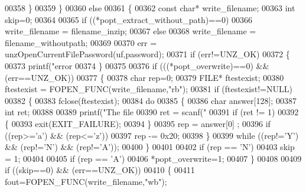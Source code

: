 \begin{DoxyCode}
{{{{{{{{{{00358         \}
00359     \}
00360     \textcolor{keywordflow}{else}
00361     \{
00362         \textcolor{keyword}{const} \textcolor{keywordtype}{char}* write\_filename;
00363         \textcolor{keywordtype}{int} skip=0;
00364 
00365         \textcolor{keywordflow}{if} ((*popt\_extract\_without\_path)==0)
00366             write\_filename = filename\_inzip;
00367         \textcolor{keywordflow}{else}
00368             write\_filename = filename\_withoutpath;
00369 
00370         err = unzOpenCurrentFilePassword(uf,password);
00371         \textcolor{keywordflow}{if} (err!=UNZ\_OK)
00372         \{
00373             printf(\textcolor{stringliteral}{"error %
00374         \}
00375 
00376         \textcolor{keywordflow}{if} (((*popt\_overwrite)==0) && (err==UNZ\_OK))
00377         \{
00378             \textcolor{keywordtype}{char} rep=0;
00379             FILE* ftestexist;
00380             ftestexist = FOPEN\_FUNC(write\_filename,\textcolor{stringliteral}{"rb"});
00381             \textcolor{keywordflow}{if} (ftestexist!=NULL)
00382             \{
00383                 fclose(ftestexist);
00384                 \textcolor{keywordflow}{do}
00385                 \{
00386                     \textcolor{keywordtype}{char} answer[128];
00387                     \textcolor{keywordtype}{int} ret;
00388 
00389                     printf(\textcolor{stringliteral}{"The file %
00390                     ret = scanf(\textcolor{stringliteral}{"%
00391                     \textcolor{keywordflow}{if} (ret != 1)
00392                     \{
00393                        exit(EXIT\_FAILURE);
00394                     \}
00395                     rep = answer[0] ;
00396                     \textcolor{keywordflow}{if} ((rep>=\textcolor{charliteral}{'a'}) && (rep<=\textcolor{charliteral}{'z'}))
00397                         rep -= 0x20;
00398                 \}
00399                 \textcolor{keywordflow}{while} ((rep!=\textcolor{charliteral}{'Y'}) && (rep!=\textcolor{charliteral}{'N'}) && (rep!=\textcolor{charliteral}{'A'}));
00400             \}
00401 
00402             \textcolor{keywordflow}{if} (rep == \textcolor{charliteral}{'N'})
00403                 skip = 1;
00404 
00405             \textcolor{keywordflow}{if} (rep == \textcolor{charliteral}{'A'})
00406                 *popt\_overwrite=1;
00407         \}
00408 
00409         \textcolor{keywordflow}{if} ((skip==0) && (err==UNZ\_OK))
00410         \{
00411             fout=FOPEN\_FUNC(write\_filename,\textcolor{stringliteral}{"wb"});
}}}}}}}}}}}}}
\end{DoxyCode}
